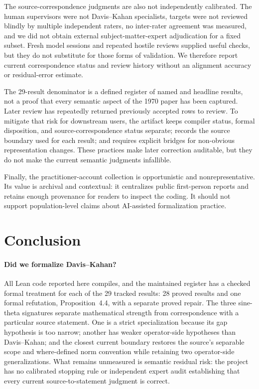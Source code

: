 \documentclass{article}
\begin{document}
The source-correspondence judgments are also not independently calibrated.  The
human supervisors were not Davis--Kahan specialists, targets were not reviewed
blindly by multiple independent raters, no inter-rater agreement was measured,
and we did not obtain external subject-matter-expert adjudication for a fixed
subset.  Fresh model sessions and repeated hostile reviews supplied useful
checks, but they do not substitute for those forms of validation.  We therefore
report current correspondence status and review history without an alignment
accuracy or residual-error estimate.

The 29-result denominator is a defined register of named and headline results,
not a proof that every semantic aspect of the 1970 paper has been captured.
Later review has repeatedly returned previously accepted rows to review.  To mitigate
that risk for downstream users, the artifact keeps compiler status, formal
disposition, and source-correspondence status separate; records the source
boundary used for each result; and requires explicit bridges for non-obvious
representation changes.  These practices make later correction auditable, but
they do not make the current semantic judgments infallible.

Finally, the practitioner-account collection is opportunistic and
nonrepresentative.  Its value is archival and contextual: it centralizes public
first-person reports and retains enough provenance for readers to inspect the
coding.  It should not support population-level claims about AI-assisted
formalization practice.

\section{Conclusion}

\paragraph{Did we formalize Davis--Kahan?}
All Lean code reported here compiles, and the maintained register has a checked
formal treatment for each of the 29 tracked results: 28 proved results and one
formal refutation, Proposition~4.4, with a separate proved repair.  The three
sine-theta signatures separate mathematical strength from correspondence with
a particular source statement.  One is a strict specialization because its gap
hypothesis is too narrow; another has weaker operator-side hypotheses than
Davis--Kahan; and the closest current boundary restores the source's separable
scope and where-defined norm convention while retaining two operator-side
generalizations.  What remains unmeasured is semantic residual risk: the
project has no calibrated stopping rule or independent expert audit establishing
that every current source-to-statement judgment is correct.
\end{document}

